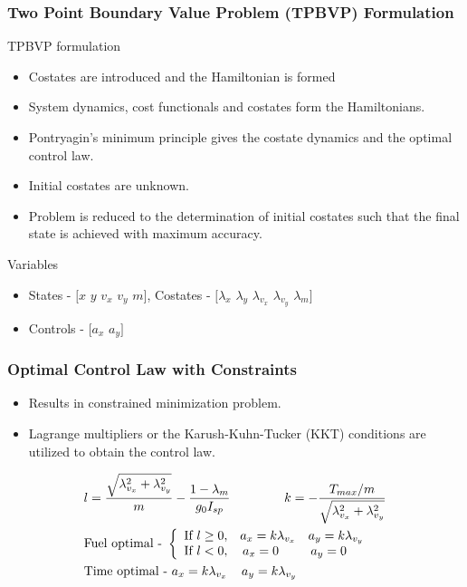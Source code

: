 \documentclass{beamer}
\begin{document}
\begin{frame}
	\frametitle{Two Point Boundary Value Problem (TPBVP) Formulation} 
	\vspace{-2.0mm}
	\begin{block}{TPBVP formulation}
		\vspace{-3mm}
		\begin{itemize}
		\item Costates are introduced and the Hamiltonian is formed
		\pause
		\item System dynamics, cost functionals and costates form the Hamiltonians.
		\pause
		\item Pontryagin's minimum principle gives the costate dynamics and the optimal control law.
		\pause
		\item Initial costates are unknown.
		\pause
		\item Problem is reduced to the determination of initial costates such that the final state is achieved with maximum accuracy.
		\end{itemize}
	\end{block}
	\pause
	\vspace{-1.5mm}
	\begin{block}{Variables}
	\begin{itemize}
		\vspace{-3mm}
		\item States - $[x$ $y$ $v_x$ $v_y$ $m]$, Costates - $[\lambda_x$ $\lambda_y$ $\lambda_{v_x}$ $\lambda_{v_y}$ $\lambda_m]$
		\item Controls - $[a_x$ $a_y]$
	\end{itemize}
	\end{block}
\end{frame}

\begin{frame}
	\frametitle{Optimal Control Law with Constraints}
	\begin{itemize}
		\item Results in constrained minimization problem.
		\item Lagrange multipliers or the Karush-Kuhn-Tucker (KKT) conditions are utilized to obtain the control law.
	\end{itemize}
	\begin{align}
		&l=\frac{\sqrt{\lambda_{v_x}^2+\lambda_{v_y}^2}}{m}-\frac{1-\lambda_m}{g_0I_{sp}} \hspace{15mm} k=-\frac{T_{max}/m}{\sqrt{\lambda_{v_x}^2+\lambda_{v_y}^2}}\\
		&\text{Fuel optimal - }\left \{
		\begin{array}{ccc}
		\text{If } l\geq 0, &a_x=k\lambda_{v_x}  &a_y=k\lambda_{v_y}\\
		\text{If } l<0, &\hspace{-4mm}a_x=0  &\hspace{-4mm}a_y=0
		\end{array}
		\right.\\
		&\text{Time optimal - }a_x=k\lambda_{v_x}\hspace{4mm}a_y=k\lambda_{v_y}
	\end{align}
\end{frame}
\end{document}
